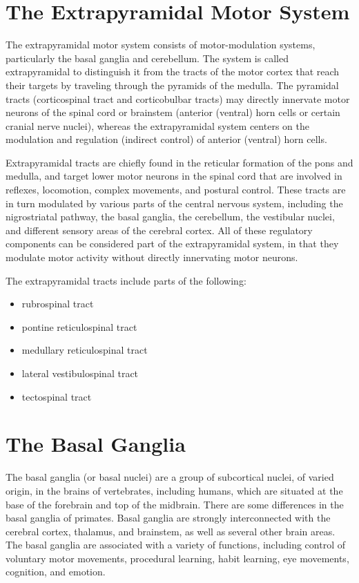 \hypertarget{the-extrapyramidal-motor-system}{%
\section{The Extrapyramidal Motor System}\label{the-extrapyramidal-motor-system}}

The extrapyramidal motor system consists of motor-modulation systems, particularly the basal ganglia and cerebellum. The system is called extrapyramidal to distinguish it from the tracts of the motor cortex that reach their targets by traveling through the pyramids of the medulla. The pyramidal tracts (corticospinal tract and corticobulbar tracts) may directly innervate motor neurons of the spinal cord or brainstem (anterior (ventral) horn cells or certain cranial nerve nuclei), whereas the extrapyramidal system centers on the modulation and regulation (indirect control) of anterior (ventral) horn cells.

Extrapyramidal tracts are chiefly found in the reticular formation of the pons and medulla, and target lower motor neurons in the spinal cord that are involved in reflexes, locomotion, complex movements, and postural control. These tracts are in turn modulated by various parts of the central nervous system, including the nigrostriatal pathway, the basal ganglia, the cerebellum, the vestibular nuclei, and different sensory areas of the cerebral cortex. All of these regulatory components can be considered part of the extrapyramidal system, in that they modulate motor activity without directly innervating motor neurons.

The extrapyramidal tracts include parts of the following:

\begin{itemize}
\tightlist
\item
  rubrospinal tract
\item
  pontine reticulospinal tract
\item
  medullary reticulospinal tract
\item
  lateral vestibulospinal tract
\item
  tectospinal tract
\end{itemize}

\hypertarget{the-basal-ganglia-1}{%
\section{The Basal Ganglia}\label{the-basal-ganglia-1}}

The basal ganglia (or basal nuclei) are a group of subcortical nuclei, of varied origin, in the brains of vertebrates, including humans, which are situated at the base of the forebrain and top of the midbrain. There are some differences in the basal ganglia of primates. Basal ganglia are strongly interconnected with the cerebral cortex, thalamus, and brainstem, as well as several other brain areas. The basal ganglia are associated with a variety of functions, including control of voluntary motor movements, procedural learning, habit learning, eye movements, cognition, and emotion.

